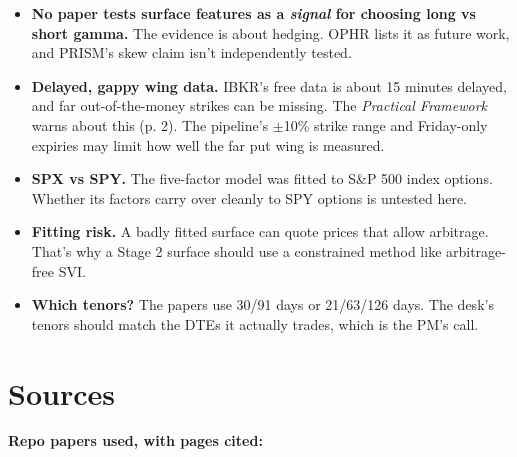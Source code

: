 \documentclass{article}
\begin{document}
\begin{itemize}

\item \textbf{No paper tests surface features as a \emph{signal} for choosing long vs short gamma.} The evidence is about hedging. OPHR lists it as future work, and PRISM's skew claim isn't independently tested.

\item \textbf{Delayed, gappy wing data.} IBKR's free data is about 15 minutes delayed, and far out-of-the-money strikes can be missing. The \emph{Practical Framework} warns about this (p. 2). The pipeline's \ensuremath{\pm}10\% strike range and Friday-only expiries may limit how well the far put wing is measured.

\item \textbf{SPX vs SPY.} The five-factor model was fitted to S\&P 500 index options. Whether its factors carry over cleanly to SPY options is untested here.

\item \textbf{Fitting risk.} A badly fitted surface can quote prices that allow arbitrage. That's why a Stage 2 surface should use a constrained method like arbitrage-free SVI.

\item \textbf{Which tenors?} The papers use 30/\allowbreak{}91 days or 21/\allowbreak{}63/\allowbreak{}126 days. The desk's tenors should match the DTEs it actually trades, which is the PM's call.

\end{itemize}

\section{Sources}

\textbf{Repo papers used, with pages cited:}
\end{document}
